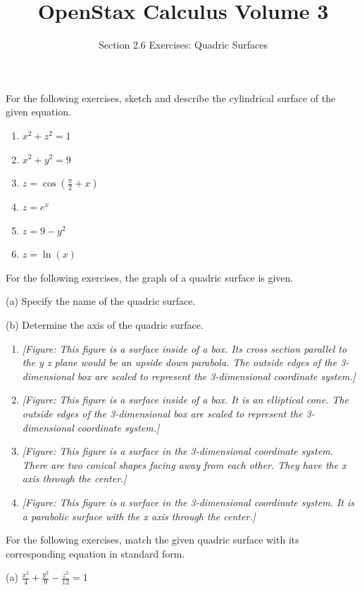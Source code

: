 \documentclass{exercises}
\title{OpenStax Calculus Volume 3}
\subtitle{Section 2.6 Exercises: Quadric Surfaces}
\author{}
\date{}
\begin{document}
\maketitle


For the following exercises, sketch and describe the cylindrical surface of the given equation.

\begin{enumerate}[start=1]
\item \techrequired $x^{2}+z^{2}=1$
\item \techrequired $x^{2}+y^{2}=9$
\item \techrequired $z=\cos(\frac{\pi}{2}+x)$
\item \techrequired $z=e^{x}$
\item \techrequired $z=9-y^{2}$
\item \techrequired $z=\ln(x)$
\end{enumerate}

For the following exercises, the graph of a quadric surface is given.


(a) Specify the name of the quadric surface.


(b) Determine the axis of the quadric surface.

\begin{enumerate}[resume]
\item \textit{[Figure: This figure is a surface inside of a box. Its cross section parallel to the y z plane would be an upside down parabola. The outside edges of the 3-dimensional box are scaled to represent the 3-dimensional coordinate system.]}
\item \textit{[Figure: This figure is a surface inside of a box. It is an elliptical cone. The outside edges of the 3-dimensional box are scaled to represent the 3-dimensional coordinate system.]}
\item \textit{[Figure: This figure is a surface in the 3-dimensional coordinate system. There are two conical shapes facing away from each other. They have the x axis through the center.]}
\item \textit{[Figure: This figure is a surface in the 3-dimensional coordinate system. It is a parabolic surface with the x axis through the center.]}
\end{enumerate}

For the following exercises, match the given quadric surface with its corresponding equation in standard form.


(a) $\frac{x^{2}}{4}+\frac{y^{2}}{9}-\frac{z^{2}}{12}=1$
\end{document}
